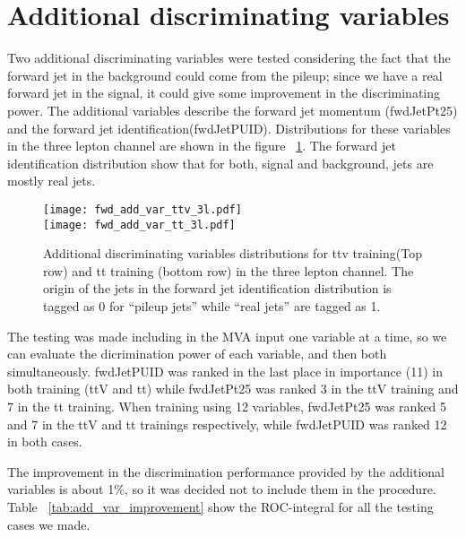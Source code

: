 \section{Additional discriminating variables}

Two additional discriminating variables were tested considering the fact that the forward jet in the background could come from the pileup; since we have a real forward jet in the signal, it could give some improvement in the discriminating power. The additional variables describe the forward jet momentum (fwdJetPt25) and the forward jet identification(fwdJetPUID). Distributions for these variables in the three lepton channel are shown in the figure ~\ref{fwd_add_var_3l}. The forward jet identification distribution show that for both, signal and background, jets are mostly real jets. 

\begin{figure} [!h]
  \centering
   \texttt{[image: fwd\_add\_var\_ttv\_3l.pdf]}\\
   \texttt{[image: fwd\_add\_var\_tt\_3l.pdf]}
\caption[Additional discriminating variables distributions.]{Additional discriminating variables distributions for ttv training(Top row) and tt training (bottom row) in the three lepton channel. The origin of the jets in the forward jet identification distribution is tagged as 0 for ``pileup jets'' while ``real jets'' are tagged as 1.}
\label{fwd_add_var_3l}
\end{figure}

The testing was made including in the MVA input one variable at a time, so we can evaluate the dicrimination power of each variable, and then both simultaneously. fwdJetPUID was ranked in the last place in importance (11) in both training (ttV and tt) while fwdJetPt25 was ranked 3 in the ttV training and 7 in the tt training. When training using 12 variables, fwdJetPt25 was ranked 5 and 7 in the ttV and tt trainings respectively, while fwdJetPUID was ranked 12 in both cases.

The improvement in the discrimination performance provided by the additional variables is about 1\%, so it was decided not to include them in the procedure. Table ~\ref{tab:add_var_improvement} show the ROC-integral for all the testing cases we made.


